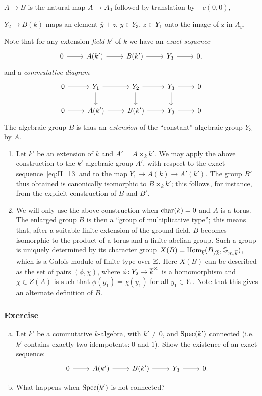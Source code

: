 $A \to B$ is the natural map $A \to A_0$ followed by translation by $- c(0,0)$,

$Y_2 \to B(k)$ maps an element $\overline{y} + z$, $y \in Y_3$, $z \in Y_1$ 
onto the image of z in $A_y$.

Note that for any extension \emph{field} $k'$ of $k$ we have an \emph{exact 
sequence}
\[
	\begin{tikzcd}
		0 \arrow[r] & A(k') \arrow[r] & B(k') \arrow[r] & Y_3 \arrow[r] & 0,
	\end{tikzcd}
\]
and a \emph{commutative diagram}
\dpage
\[
	\begin{tikzcd}
		0 \arrow[r] & Y_1 \arrow[r] \arrow[d] & Y_2 \arrow[r] \arrow[d] & Y_3 
		\arrow[r] \arrow[d] & 0 \\
		0 \arrow[r] & A(k') \arrow[r] & B(k') \arrow[r] & Y_3 \arrow[r] & 0
	\end{tikzcd}
\]
The algebraic group $B$ is thus an \emph{extension} of the ``constant'' algebraic group $Y_3$ by $A$.
\begin{obs}
\begin{enumerate}
	\item Let $k'$ be an extension of $k$ and $A' = A \times_k k'$. We may 
	apply the above construction to the $k'$-algebraic group $A'$, with respect 
	to the exact sequence~\eqref{eq:II_13} and to the map $Y_1 \to A(k) \to
	A'(k') $. The group $B'$ thus obtained is canonically isomorphic to $B
	\times_k k'$; this follows, for instance, from the explicit construction
	of $B$ and $B'$.
	
	\item We will only use the above construction when $\operatorname{char}(k) = 0$ and $A$ 
	is a torus. The enlarged group $B$ is then a ``group of multiplicative 
	type''; this means that, after a suitable finite extension of the ground 
	field, $B$ becomes isomorphic to the product of a torus and a finite 
	abelian group. Such a group is uniquely determined by its character group $X
	(B) = \operatorname{Hom}_{\overline{k}} (B_{/\overline{k}}, \mathbb{G}_{m, \overline{k}})$, which is a 
	Galois-module of finite type over $\mathbb{Z}$. Here $X(B)$ can be described as the 
	set of pairs $(\phi, \chi)$, where $\phi \colon Y_2 \to
	{\overline{k}}^\times$ is a homomorphism and $\chi \in Z(A)$ is such that
	$\phi(y_1) = \chi(y_1)$ for all $y_1 \in Y_1$. Note that this gives an
	alternate definition of $B$. 
\end{enumerate}
\end{obs}

\subsubsection*{Exercise}
\begin{enumerate}[a)]
	\item Let $k'$ be a commutative $k$-algebra, with $k' \neq 0$, and $\operatorname{Spec}
	(k')$ connected (i.e.\ $k'$ contains exactly two idempotents: $0$ and $1$). 
	Show the existence of an exact sequence:
	\dpage
	\[\begin{tikzcd}
		0 \rar & A(k') \rar & B(k') \rar & Y_3 \rar & 0.
	\end{tikzcd}\]
	\item What happens when $\operatorname{Spec}(k')$ is not connected?
\end{enumerate}

